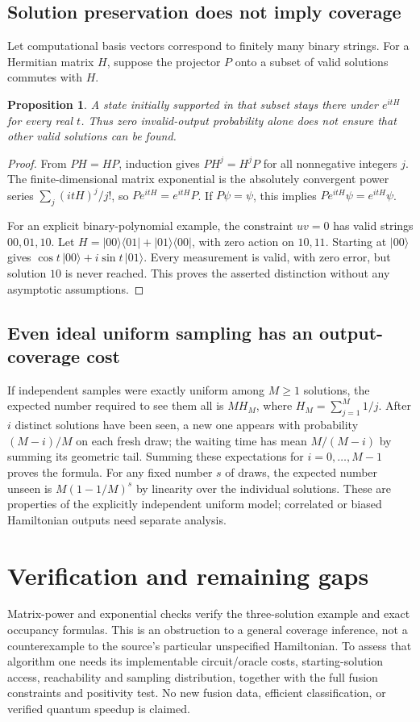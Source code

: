 \documentclass[11pt]{article}
\newtheorem{proposition}{Proposition}
\begin{document}
\subsection{Solution preservation does not imply coverage}
Let computational basis vectors correspond to finitely many binary strings. For a Hermitian matrix $H$, suppose the projector $P$ onto a subset of valid solutions commutes with $H$.
\begin{proposition}
A state initially supported in that subset stays there under $e^{itH}$ for every real $t$. Thus zero invalid-output probability alone does not ensure that other valid solutions can be found.
\end{proposition}
\begin{proof}
From $PH=HP$, induction gives $PH^j=H^jP$ for all nonnegative integers $j$. The finite-dimensional matrix exponential is the absolutely convergent power series $\sum_j(itH)^j/j!$, so $Pe^{itH}=e^{itH}P$. If $P\psi=\psi$, this implies $Pe^{itH}\psi=e^{itH}\psi$.

For an explicit binary-polynomial example, the constraint $uv=0$ has valid strings $00,01,10$. Let $H=|00\rangle\langle01|+|01\rangle\langle00|$, with zero action on $10,11$. Starting at $|00\rangle$ gives $\cos t\,|00\rangle+i\sin t\,|01\rangle$. Every measurement is valid, with zero error, but solution $10$ is never reached. This proves the asserted distinction without any asymptotic assumptions.
\end{proof}
\subsection{Even ideal uniform sampling has an output-coverage cost}
If independent samples were exactly uniform among $M\ge1$ solutions, the expected number required to see them all is $M H_M$, where $H_M=\sum_{j=1}^M1/j$. After $i$ distinct solutions have been seen, a new one appears with probability $(M-i)/M$ on each fresh draw; the waiting time has mean $M/(M-i)$ by summing its geometric tail. Summing these expectations for $i=0,\ldots,M-1$ proves the formula. For any fixed number $s$ of draws, the expected number unseen is $M(1-1/M)^s$ by linearity over the individual solutions. These are properties of the explicitly independent uniform model; correlated or biased Hamiltonian outputs need separate analysis.
\section{Verification and remaining gaps}
Matrix-power and exponential checks verify the three-solution example and exact occupancy formulas. This is an obstruction to a general coverage inference, not a counterexample to the source's particular unspecified Hamiltonian. To assess that algorithm one needs its implementable circuit/oracle costs, starting-solution access, reachability and sampling distribution, together with the full fusion constraints and positivity test. No new fusion data, efficient classification, or verified quantum speedup is claimed.
\end{document}
